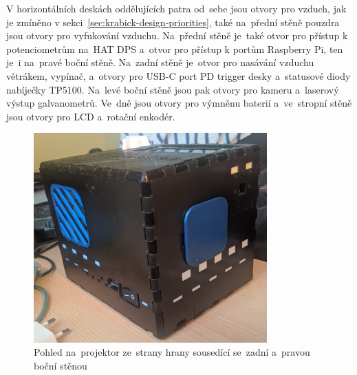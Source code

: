 V horizontálních deskách oddělujících patra od~sebe jsou otvory pro vzduch, jak je zmíněno v sekci~\ref{sec:krabick-design-priorities}, také na~přední stěně pouzdra jsou otvory pro vyfukování vzduchu. Na~přední stěně je~také otvor pro přístup k potenciometrům na~HAT DPS a~otvor pro přístup k portům Raspberry Pi, ten je~i na~pravé boční stěně.
Na~zadní stěně je~otvor pro nasávání vzduchu větrákem, vypínač, a~otvory pro USB-C port PD trigger desky a~statusové diody nabíječky TP5100. Na~levé boční stěně jsou pak otvory pro kameru a~laserový výstup galvanometrů. Ve~dně jsou otvory pro výmněnu baterií a~ve~stropní stěně jsou otvory pro LCD a~rotační enkodér.

\begin{figure}[htb]
  \centering
  \includegraphics[width=0.8\textwidth]{img/hw_sides_backleft.jpg}
  \caption{\label{fig:hw_sides_backleft.jpg} Pohled na~projektor ze~strany hrany sousedící se~zadní a~pravou boční stěnou}
\end{figure}


